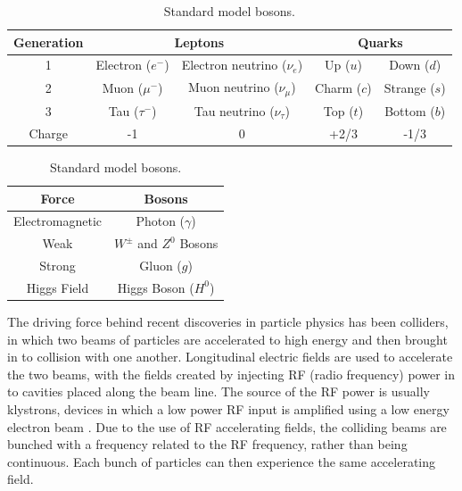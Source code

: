 \begin{table}
  \begin{center}
    \begin{tabular}{|c | c c | c c|}
	   \hline
       Generation & \multicolumn{2}{c|}{Leptons} & \multicolumn{2}{c|}{Quarks} \\
       \hline
       1 & Electron (\(e^-\)) & Electron neutrino (\(\nu_e\)) & Up (\(u\)) & Down (\(d\)) \\
       2 & Muon (\(\mu^-\)) & Muon neutrino (\(\nu_\mu\)) & Charm (\(c\)) & Strange (\(s\)) \\
       3 & Tau (\(\tau^-\)) & Tau neutrino (\(\nu_\tau\)) & Top (\(t\)) & Bottom (\(b\)) \\
	   \hline
	   Charge & -1 & 0 & +2/3 & -1/3 \\
	   \hline
    \end{tabular}
    \caption{Standard model fermions.}
  	\label{t:fermions}
  	\vspace{0.5 cm}
  	\begin{tabular}{| c c |}
	   \hline
       Force & Bosons \\
       \hline
       Electromagnetic & Photon (\(\gamma\)) \\
       Weak & \(W^{\pm}\) and \(Z^0\) Bosons \\
       Strong & Gluon (\(g\)) \\
	   Higgs Field & Higgs Boson (\(H^0\)) \\
	   \hline
    \end{tabular}
    \caption{Standard model bosons.}
  	\label{t:bosons}

  \end{center}
\end{table}


The driving force behind recent discoveries in particle physics has been colliders, in which two beams of particles are accelerated to high energy and then brought in to collision with one another. Longitudinal electric fields are used to accelerate the two beams, with the fields created by injecting RF (radio frequency) power in to cavities placed along the beam line. The source of the RF power is usually klystrons, devices in which a low power RF input is amplified using a low energy electron beam \cite{klyst}. Due to the use of RF accelerating fields, the colliding beams are bunched with a frequency related to the RF frequency, rather than being continuous. Each bunch of particles can then experience the same accelerating field.


